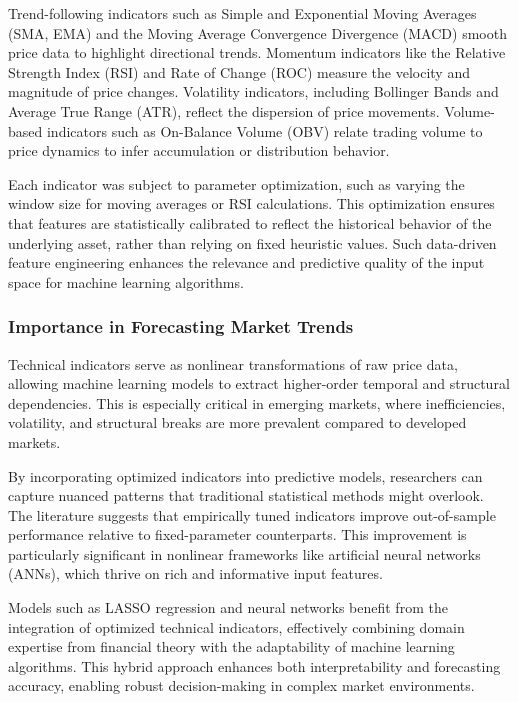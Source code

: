 Trend-following indicators such as Simple and Exponential Moving Averages (SMA, EMA) and the Moving Average Convergence Divergence (MACD) smooth price data to highlight directional trends. Momentum indicators like the Relative Strength Index (RSI) and Rate of Change (ROC) measure the velocity and magnitude of price changes. Volatility indicators, including Bollinger Bands and Average True Range (ATR), reflect the dispersion of price movements. Volume-based indicators such as On-Balance Volume (OBV) relate trading volume to price dynamics to infer accumulation or distribution behavior.

Each indicator was subject to parameter optimization, such as varying the window size for moving averages or RSI calculations. This optimization ensures that features are statistically calibrated to reflect the historical behavior of the underlying asset, rather than relying on fixed heuristic values. Such data-driven feature engineering enhances the relevance and predictive quality of the input space for machine learning algorithms.

\subsubsection{Importance in Forecasting Market Trends}

Technical indicators serve as nonlinear transformations of raw price data, allowing machine learning models to extract higher-order temporal and structural dependencies. This is especially critical in emerging markets, where inefficiencies, volatility, and structural breaks are more prevalent compared to developed markets.

By incorporating optimized indicators into predictive models, researchers can capture nuanced patterns that traditional statistical methods might overlook. The literature suggests that empirically tuned indicators improve out-of-sample performance relative to fixed-parameter counterparts. This improvement is particularly significant in nonlinear frameworks like artificial neural networks (ANNs), which thrive on rich and informative input features.

Models such as LASSO regression and neural networks benefit from the integration of optimized technical indicators, effectively combining domain expertise from financial theory with the adaptability of machine learning algorithms. This hybrid approach enhances both interpretability and forecasting accuracy, enabling robust decision-making in complex market environments.

